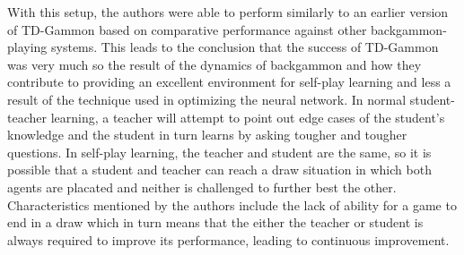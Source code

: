 With this setup,
the authors were able to perform similarly to an earlier version of TD-Gammon
based on comparative performance against other backgammon-playing systems.
%
This leads to the conclusion that the success of TD-Gammon was very much so
the result of the dynamics of backgammon and how they contribute to providing an
excellent environment for self-play learning
and less a result of the technique used in optimizing the neural network.
%
In normal student-teacher learning,
a teacher will attempt to point out edge cases of the student's knowledge
and the student in turn learns by asking tougher and tougher questions.
%
In self-play learning,
the teacher and student are the same,
so it is possible that a student and teacher can reach a draw situation in which
both agents are placated and neither is challenged to further best the other.
%
Characteristics mentioned by the authors include the lack of ability for a game
to end in a draw which in turn means that the either the teacher or student is
always required to improve its performance,
leading to continuous improvement.

